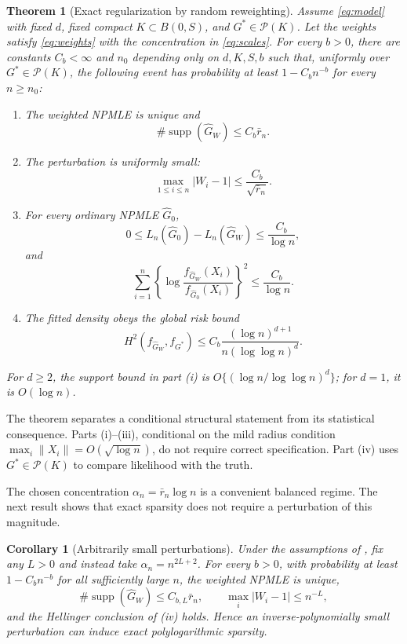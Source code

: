 \documentclass[11pt]{article}
\newtheorem{theorem}{Theorem}[section]
\newtheorem{corollary}[corollary]{Corollary}
\theoremstyle{definition}
\theoremstyle{remark}
\DeclareMathOperator{\supp}{supp}
\newcommand{\Pcal}{\mathcal P}
\newcommand{\norm}[1]{\lVert #1\rVert}
\newcommand{\abs}[1]{\lvert #1\rvert}
\newcommand{\Ghat}{\widehat G}
\begin{document}
\begin{theorem}[Exact regularization by random reweighting]
\label{thm:main}
Assume \eqref{eq:model} with fixed $d$, fixed compact
$K\subset B(0,S)$, and $G^*\in\Pcal(K)$.  Let the weights satisfy
\eqref{eq:weights} with the concentration in \eqref{eq:scales}.  For every
$b>0$, there are constants $C_b<\infty$ and $n_0$ depending only on
$d,K,S,b$ such that, uniformly over $G^*\in\Pcal(K)$, the following event has
probability at least $1-C_bn^{-b}$ for every $n\ge n_0$:
\begin{enumerate}[label=\textup{(\roman*)}]
\item The weighted NPMLE is unique and
\[
  \#\supp(\Ghat_W)\le C_b\bar r_n.
\]
\item The perturbation is uniformly small:
\[
  \max_{1\le i\le n}\abs{W_i-1}\le \frac{C_b}{\sqrt{\bar r_n}}.
\]
\item For every ordinary NPMLE $\Ghat_0$,
\[
  0\le L_n(\Ghat_0)-L_n(\Ghat_W)\le\frac{C_b}{\log n},
\]
and
\[
 \sum_{i=1}^n
 \left\{\log\frac{f_{\Ghat_W}(X_i)}{f_{\Ghat_0}(X_i)}\right\}^2
 \le\frac{C_b}{\log n}.
\]
\item The fitted density obeys the global risk bound
\[
 H^2(f_{\Ghat_W},f_{G^*})
 \le C_b\frac{(\log n)^{d+1}}
 {n(\log\log n)^d}.
\]
\end{enumerate}
For $d\ge2$, the support bound in part \textup{(i)} is
$O\{(\log n/\log\log n)^d\}$; for $d=1$, it is $O(\log n)$.
\end{theorem}

The theorem separates a conditional structural statement from its statistical
consequence.  Parts (i)--(iii), conditional on the mild radius condition
$\max_i\norm{X_i}=O(\sqrt{\log n})$, do not require correct specification.
Part (iv) uses $G^*\in\Pcal(K)$ to compare likelihood with the truth.

The chosen concentration $\alpha_n=\bar r_n\log n$ is a convenient balanced
regime.  The next result shows that exact sparsity does not require a
perturbation of this magnitude.

\begin{corollary}[Arbitrarily small perturbations]
\label{cor:tiny}
Under the assumptions of , fix any $L>0$ and instead take
$\alpha_n=n^{2L+2}$.  For every $b>0$, with probability at least
$1-C_bn^{-b}$ for all sufficiently large $n$, the weighted NPMLE is unique,
\[
 \#\supp(\Ghat_W)\le C_{b,L}\bar r_n,
 \qquad
 \max_i\abs{W_i-1}\le n^{-L},
\]
and the Hellinger conclusion of (iv) holds.  Hence an
inverse-polynomially small perturbation can induce exact polylogarithmic
sparsity.
\end{corollary}
\end{document}

